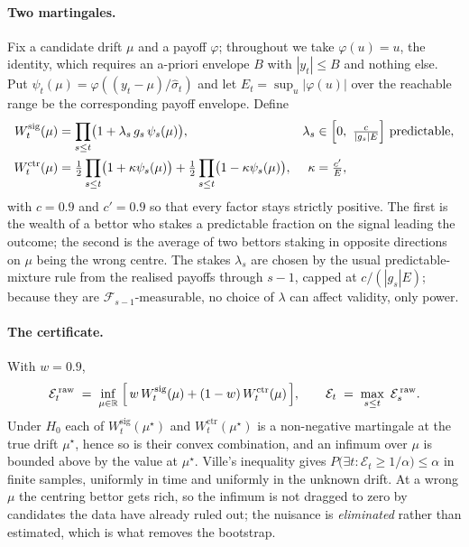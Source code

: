 \documentclass{article}
\theoremstyle{plain}
\theoremstyle{definition}
\begin{document}
\paragraph{Two martingales.} Fix a candidate drift $\mu$ and a payoff $\varphi$; throughout we
take $\varphi(u)=u$, the identity, which requires an a-priori envelope $B$ with $|y_t|\le B$ and
nothing else. Put $\psi_t(\mu)=\varphi\!\left((y_t-\mu)/\hat\sigma_t\right)$ and let
$E_t=\sup_u|\varphi(u)|$ over the reachable range be the corresponding payoff envelope. Define
\begin{align*}
  W^{\mathrm{sig}}_t(\mu) &= \prod_{s\le t}\bigl(1+\lambda_s\,g_s\,\psi_s(\mu)\bigr),
  &\lambda_s &\in \Bigl[0,\ \tfrac{c}{|g_s|E}\Bigr] \ \text{predictable},\\
  W^{\mathrm{ctr}}_t(\mu) &= \tfrac12\prod_{s\le t}\bigl(1+\kappa\psi_s(\mu)\bigr)
                        + \tfrac12\prod_{s\le t}\bigl(1-\kappa\psi_s(\mu)\bigr),
  &\kappa &= \tfrac{c'}{E},
\end{align*}
with $c=0.9$ and $c'=0.9$ so that every factor stays strictly positive. The first is the wealth
of a bettor who stakes a predictable fraction on the signal leading the outcome; the second is
the average of two bettors staking in opposite directions on $\mu$ being the wrong centre. The
stakes $\lambda_s$ are chosen by the usual predictable-mixture rule from the realised payoffs
through $s-1$, capped at $c/(|g_s|E)$; because they are $\mathcal{F}_{s-1}$-measurable, no
choice of $\lambda$ can affect validity, only power.

\paragraph{The certificate.} With $w=0.9$,
\[
  \mathcal{E}^{\,\mathrm{raw}}_t \;=\; \inf_{\mu\in\mathbb{R}}\;
  \Bigl[\,w\,W^{\mathrm{sig}}_t(\mu) + (1-w)\,W^{\mathrm{ctr}}_t(\mu)\,\Bigr],
  \qquad
  \mathcal{E}_t \;=\; \max_{s\le t}\ \mathcal{E}^{\,\mathrm{raw}}_s .
\]
Under $H_0$ each of $W^{\mathrm{sig}}_t(\mu^\star)$ and $W^{\mathrm{ctr}}_t(\mu^\star)$ is a
non-negative martingale at the true drift $\mu^\star$, hence so is their convex combination, and
an infimum over $\mu$ is bounded above by the value at $\mu^\star$. Ville's inequality gives
$P\bigl(\exists t:\mathcal{E}_t\ge1/\alpha\bigr)\le\alpha$ in finite samples, uniformly in time
and uniformly in the unknown drift. At a wrong $\mu$ the centring bettor gets rich, so the
infimum is not dragged to zero by candidates the data have already ruled out; the nuisance is
\emph{eliminated} rather than estimated, which is what removes the bootstrap.
\end{document}
